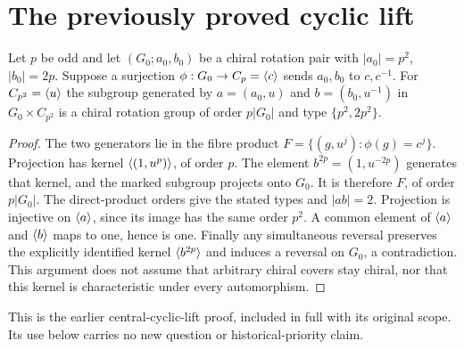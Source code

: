 \section{The previously proved cyclic lift}
\begin{theorem}\label{UF.CyclicLift}
Let $p$ be odd and let $(G_0;a_0,b_0)$ be a chiral rotation pair
with $|a_0|=p^2$, $|b_0|=2p$. Suppose a surjection
$\phi:G_0\to C_p=\langle c\rangle$ sends $a_0,b_0$ to $c,c^{-1}$.
For $C_{p^2}=\langle u\rangle$ the subgroup generated by
$a=(a_0,u)$ and $b=(b_0,u^{-1})$ in $G_0\times C_{p^2}$
is a chiral rotation group of order $p|G_0|$ and type
$\{p^2,2p^2\}$.
\end{theorem}
\begin{proof}
The two generators lie in the fibre product
$F=\{(g,u^j):\phi(g)=c^j\}$. Projection has kernel
$\langle (1,u^p)\rangle$, of order $p$. The element
$b^{2p}=(1,u^{-2p})$ generates that kernel, and the marked subgroup
projects onto $G_0$. It is therefore $F$, of order $p|G_0|$.
The direct-product orders give the stated types and $|ab|=2$.
Projection is injective on $\langle a\rangle$, since its image has the same
order $p^2$. A common element of $\langle a\rangle$ and $\langle b\rangle$ maps to
one, hence is one. Finally any simultaneous reversal preserves
the explicitly identified kernel $\langle b^{2p}\rangle$ and induces a
reversal on $G_0$, a contradiction. This argument does not assume
that arbitrary chiral covers stay chiral, nor that this kernel is
characteristic under every automorphism.
\end{proof}
This is the earlier central-cyclic-lift proof, included in full with
its original scope. Its use below carries no new question or
historical-priority claim.
